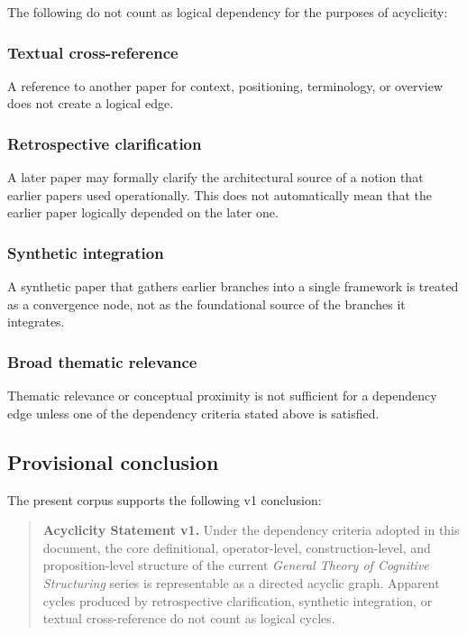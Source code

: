 \documentclass[11pt,a4paper]{article}
\begin{document}
	The following do not count as logical dependency for the purposes of acyclicity:
	
	\subsubsection*{Textual cross-reference}
	
	A reference to another paper for context, positioning, terminology, or overview does not create
	a logical edge.
	
	\subsubsection*{Retrospective clarification}
	
	A later paper may formally clarify the architectural source of a notion that earlier papers used
	operationally. This does not automatically mean that the earlier paper logically depended on the
	later one.
	
	\subsubsection*{Synthetic integration}
	
	A synthetic paper that gathers earlier branches into a single framework is treated as a convergence
	node, not as the foundational source of the branches it integrates.
	
	\subsubsection*{Broad thematic relevance}
	
	Thematic relevance or conceptual proximity is not sufficient for a dependency edge unless one of
	the dependency criteria stated above is satisfied.
	
	\subsection{Provisional conclusion}
	
	The present corpus supports the following v1 conclusion:
	
	\begin{quote}
		\textbf{Acyclicity Statement v1.} Under the dependency criteria adopted in this document, the core definitional, operator-level, construction-level, and proposition-level structure of the current \emph{General Theory of Cognitive Structuring} series is representable as a directed acyclic graph. Apparent cycles produced by retrospective clarification, synthetic integration,	or textual cross-reference do not count as logical cycles.
	\end{quote}
	
\end{document}

